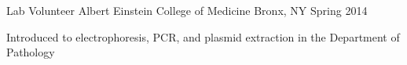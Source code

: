 \begin{cventries}

  \cventry
    {Lab Volunteer} %
    {Albert Einstein College of Medicine} %
    {Bronx, NY} %
    {Spring 2014} %
    {
      \begin{cvitems} %
        \item {Introduced to electrophoresis, PCR, and plasmid extraction in the Department of Pathology}
      \end{cvitems}
    }


\end{cventries}
